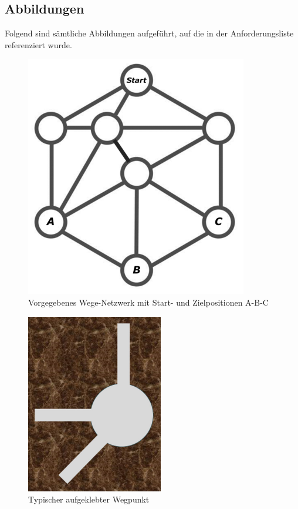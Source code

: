 \documentclass[../main.tex]{subfiles}
\begin{document}
\newpage

\subsection{Abbildungen}
Folgend sind sämtliche Abbildungen aufgeführt, auf die in der
Anforderungsliste referenziert wurde.

\begin{figure} [ht]
  \centering
  \includegraphics[scale=0.5]{../resources/WegeNetzwerk.png}
  \caption{Vorgegebenes Wege-Netzwerk mit Start- und Zielpositionen A-B-C}
  \label{fig:wege-netzwerk}
\end{figure}

\begin{figure} [ht]
  \centering
  \includegraphics[scale=0.5]{../resources/Wegpunkt.png}
  \caption{Typischer aufgeklebter Wegpunkt}
  \label{fig:wegpunkt}
\end{figure}
\end{document}
